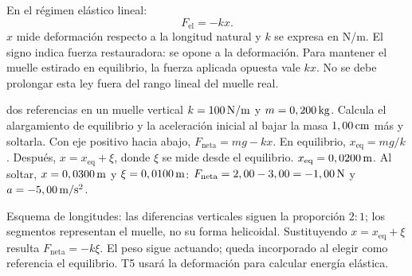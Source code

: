 \documentclass[11pt,a4paper]{article}
\begin{document}
En el r\'egimen el\'astico lineal:
\[
F_{\mathrm{el}}=-kx.
\]
$x$ mide deformaci\'on respecto a la longitud natural y $k$ se expresa en N/m.
El signo indica fuerza restauradora: se opone a la deformaci\'on.
Para mantener el muelle estirado en equilibrio, la fuerza aplicada opuesta vale $kx$.
No se debe prolongar esta ley fuera del rango lineal del muelle real.

\begin{examplebox}{dos referencias en un muelle vertical}
 $k=100\,\mathrm{N/m}$ y $m=0,200\,\mathrm{kg}$.
Calcula el alargamiento de equilibrio y la aceleraci\'on inicial al bajar
la masa $1,00\,\mathrm{cm}$ m\'as y soltarla.
\solutionblock
{} Con eje positivo hacia abajo, $F_{\mathrm{neta}}=mg-kx$.
En equilibrio, $x_{\mathrm{eq}}=mg/k$. Despu\'es,
$x=x_{\mathrm{eq}}+\xi$, donde $\xi$ se mide desde el equilibrio.
 $x_{\mathrm{eq}}=0,0200\,\mathrm{m}$.
Al soltar, $x=0,0300\,\mathrm{m}$ y $\xi=0,0100\,\mathrm{m}$:
$F_{\mathrm{neta}}=2,00-3,00=-1,00\,\mathrm{N}$ y $a=-5,00\,\mathrm{m/s^2}$.
\begin{center}
\end{center}
Esquema de longitudes: las diferencias verticales siguen la proporci\'on $2:1$;
los segmentos representan el muelle, no su forma helicoidal.
 Sustituyendo $x=x_{\mathrm{eq}}+\xi$ resulta
$F_{\mathrm{neta}}=-k\xi$. El peso sigue actuando; queda incorporado al elegir
como referencia el equilibrio. T5 usar\'a la deformaci\'on para calcular energ\'ia el\'astica.
\end{examplebox}
\end{document}
